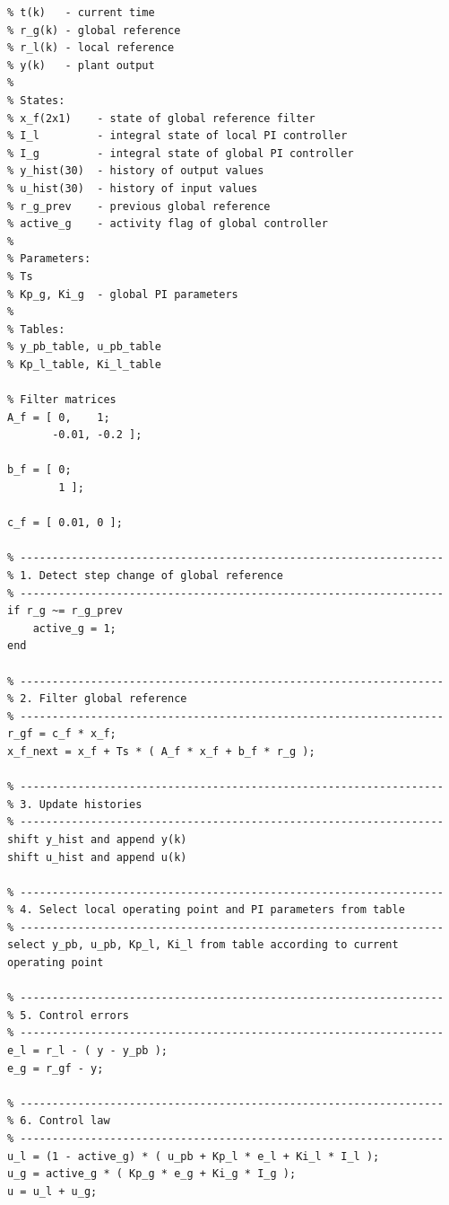 \begin{lstlisting}[style = pseudocode,
caption={Pseudokód prepínania na základe detekcie ustálenia},
label={lst:pi_switch_settling_based}]
% Inputs:
% t(k)   - current time
% r_g(k) - global reference
% r_l(k) - local reference
% y(k)   - plant output
%
% States:
% x_f(2x1)    - state of global reference filter
% I_l         - integral state of local PI controller
% I_g         - integral state of global PI controller
% y_hist(30)  - history of output values
% u_hist(30)  - history of input values
% r_g_prev    - previous global reference
% active_g    - activity flag of global controller
%
% Parameters:
% Ts
% Kp_g, Ki_g  - global PI parameters
%
% Tables:
% y_pb_table, u_pb_table
% Kp_l_table, Ki_l_table

% Filter matrices
A_f = [ 0,    1;
       -0.01, -0.2 ];

b_f = [ 0;
        1 ];

c_f = [ 0.01, 0 ];

% ------------------------------------------------------------------
% 1. Detect step change of global reference
% ------------------------------------------------------------------
if r_g ~= r_g_prev
    active_g = 1;
end

% ------------------------------------------------------------------
% 2. Filter global reference
% ------------------------------------------------------------------
r_gf = c_f * x_f;
x_f_next = x_f + Ts * ( A_f * x_f + b_f * r_g );

% ------------------------------------------------------------------
% 3. Update histories
% ------------------------------------------------------------------
shift y_hist and append y(k)
shift u_hist and append u(k)

% ------------------------------------------------------------------
% 4. Select local operating point and PI parameters from table
% ------------------------------------------------------------------
select y_pb, u_pb, Kp_l, Ki_l from table according to current operating point

% ------------------------------------------------------------------
% 5. Control errors
% ------------------------------------------------------------------
e_l = r_l - ( y - y_pb );
e_g = r_gf - y;

% ------------------------------------------------------------------
% 6. Control law
% ------------------------------------------------------------------
u_l = (1 - active_g) * ( u_pb + Kp_l * e_l + Ki_l * I_l );
u_g = active_g * ( Kp_g * e_g + Ki_g * I_g );
u = u_l + u_g;


\end{lstlisting}
